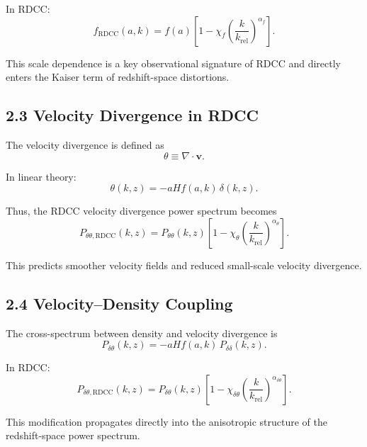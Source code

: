 \documentclass[11pt,a4paper]{article}
\begin{document}
In RDCC:
\begin{equation}
f_{\mathrm{RDCC}}(a,k)
=
f(a)
\left[
1
-
\chi_{f}
\left(
\frac{k}{k_{\mathrm{rel}}}
\right)^{\alpha_{f}}
\right].
\end{equation}

This scale dependence is a key observational signature of RDCC and directly enters the
Kaiser term of redshift-space distortions.

\subsection{2.3 Velocity Divergence in RDCC}

The velocity divergence is defined as
\begin{equation}
\theta \equiv \nabla\cdot\mathbf{v}.
\end{equation}

In linear theory:
\begin{equation}
\theta(k,z) = -aHf(a,k)\,\delta(k,z).
\end{equation}

Thus, the RDCC velocity divergence power spectrum becomes
\begin{equation}
P_{\theta\theta,\mathrm{RDCC}}(k,z)
=
P_{\theta\theta}(k,z)
\left[
1
-
\chi_{\theta}
\left(
\frac{k}{k_{\mathrm{rel}}}
\right)^{\alpha_{\theta}}
\right].
\end{equation}

This predicts smoother velocity fields and reduced small-scale velocity divergence.

\subsection{2.4 Velocity–Density Coupling}

The cross-spectrum between density and velocity divergence is
\begin{equation}
P_{\delta\theta}(k,z)
=
-aHf(a,k)\,P_{\delta\delta}(k,z).
\end{equation}

In RDCC:
\begin{equation}
P_{\delta\theta,\mathrm{RDCC}}(k,z)
=
P_{\delta\theta}(k,z)
\left[
1
-
\chi_{\delta\theta}
\left(
\frac{k}{k_{\mathrm{rel}}}
\right)^{\alpha_{\delta\theta}}
\right].
\end{equation}

This modification propagates directly into the anisotropic structure of the redshift-space
power spectrum.
\end{document}
